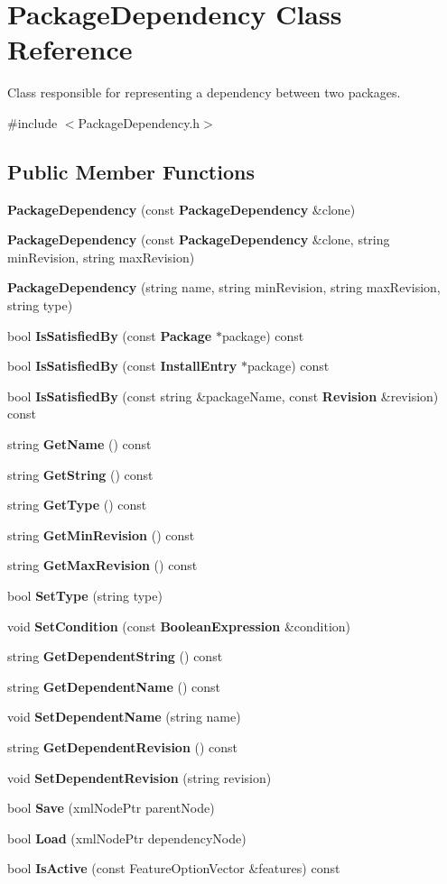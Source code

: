 \section{PackageDependency Class Reference}
\label{classPackageDependency}


Class responsible for representing a dependency between two packages.  




{\ttfamily \#include $<$PackageDependency.h$>$}

\subsection*{Public Member Functions}
\begin{DoxyCompactItemize}
\item 
{\bf PackageDependency} (const {\bf PackageDependency} \&clone)
\item 
{\bf PackageDependency} (const {\bf PackageDependency} \&clone, string minRevision, string maxRevision)
\item 
{\bf PackageDependency} (string name, string minRevision, string maxRevision, string type)
\item 
bool {\bf IsSatisfiedBy} (const {\bf Package} $\ast$package) const 
\item 
bool {\bf IsSatisfiedBy} (const {\bf InstallEntry} $\ast$package) const 
\item 
bool {\bf IsSatisfiedBy} (const string \&packageName, const {\bf Revision} \&revision) const 
\item 
string {\bf GetName} () const 
\item 
string {\bf GetString} () const 
\item 
string {\bf GetType} () const 
\item 
string {\bf GetMinRevision} () const 
\item 
string {\bf GetMaxRevision} () const 
\item 
bool {\bf SetType} (string type)
\item 
void {\bf SetCondition} (const {\bf BooleanExpression} \&condition)
\item 
string {\bf GetDependentString} () const 
\item 
string {\bf GetDependentName} () const 
\item 
void {\bf SetDependentName} (string name)
\item 
string {\bf GetDependentRevision} () const 
\item 
void {\bf SetDependentRevision} (string revision)
\item 
bool {\bf Save} (xmlNodePtr parentNode)
\item 
bool {\bf Load} (xmlNodePtr dependencyNode)
\item 
bool {\bf IsActive} (const FeatureOptionVector \&features) const 
\end{DoxyCompactItemize}
